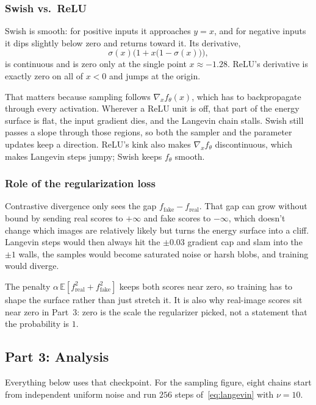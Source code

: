 \subsubsection{Swish vs.\ ReLU}

Swish is smooth: for positive inputs it approaches \(y = x\), and for negative inputs it dips slightly below zero and returns toward it. Its derivative,
\[
  \sigma(x)\bigl(1 + x\bigl(1-\sigma(x)\bigr)\bigr),
\]
is continuous and is zero only at the single point \(x \approx -1.28\). ReLU's derivative is exactly zero on all of \(x < 0\) and jumps at the origin.

That matters because sampling follows \(\nabla_x f_\theta(x)\), which has to backpropagate through every activation. Wherever a ReLU unit is off, that part of the energy surface is flat, the input gradient dies, and the Langevin chain stalls. Swish still passes a slope through those regions, so both the sampler and the parameter updates keep a direction. ReLU's kink also makes \(\nabla_x f_\theta\) discontinuous, which makes Langevin steps jumpy; Swish keeps \(f_\theta\) smooth.

\subsubsection{Role of the regularization loss}

Contrastive divergence only sees the gap \(f_{\mathrm{fake}} - f_{\mathrm{real}}\). That gap can grow without bound by sending real scores to \(+\infty\) and fake scores to \(-\infty\), which doesn't change which images are relatively likely but turns the energy surface into a cliff. Langevin steps would then always hit the \(\pm 0.03\) gradient cap and slam into the \(\pm 1\) walls, the samples would become saturated noise or harsh blobs, and training would diverge.

The penalty \(\alpha\,\mathbb{E}[f_{\mathrm{real}}^{2} + f_{\mathrm{fake}}^{2}]\) keeps both scores near zero, so training has to shape the surface rather than just stretch it. It is also why real-image scores sit near zero in Part~3: zero is the scale the regularizer picked, not a statement that the probability is \(1\).

\subsection{Part 3: Analysis}

Everything below uses that checkpoint. For the sampling figure, eight chains start from independent uniform noise and run \(256\) steps of~\eqref{eq:langevin} with \(\nu = 10\).

